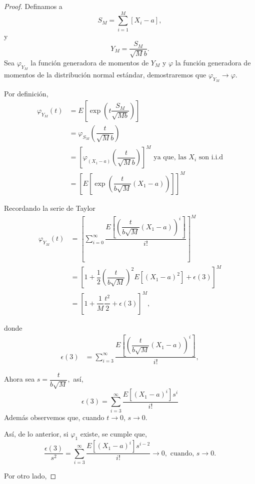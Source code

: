 \documentclass[
  letterpaper,
  DIV=11,
  numbers=noendperiod]{scrreprt}
\theoremstyle{definition}
\theoremstyle{plain}
\theoremstyle{remark}
\begin{document}
\begin{proof}

Definamos a \[
S_{M}={\displaystyle \sum_{i=1}^{M}}\left[X_{i}-a\right],
\] y \[
Y_{M}=\dfrac{S_{M}}{\sqrt{M}b}.
\] Sea \(\varphi_{Y_{M}}\) la función generadora de momentos de
\(Y_{M}\) y \(\varphi\) la función generadora de momentos de la
distribución normal estándar, demostraremos que
\(\varphi_{Y_{M}}\to\varphi\).

Por definición, \begin{align*}
\varphi_{Y_{M}}\left(t\right) & =E\left[\exp\left(t\dfrac{S_{M}}{\sqrt{Mb}}\right)\right]\\
& =\varphi_{S_M}\left(\dfrac{t}{\sqrt{M}b}\right)\\
& =\left[\varphi_{\left(X_{1}-a\right)}\left(\dfrac{t}{\sqrt{M}b}\right)\right]^{M} \text{ ya que, las }X_{i}\text{ son i.i.d}\\
& =\left[E\left[\exp\left(\dfrac{t}{b\sqrt{M}}\left(X_{1}-a\right)\right)\right]\right]^{M}
\end{align*}

Recordando la serie de Taylor \begin{align*}
\varphi_{Y_M}\left(t\right) & =\left[\sum_{i=0}^{\infty}\dfrac{E\left[\left(\dfrac{t}{b\sqrt{M}}\left(X_{1}-a\right)\right)^{i}\right]}{i!}\right]^{M}\\
& =\left[1+\dfrac{1}{2}\left(\dfrac{t}{b\sqrt{M}}\right)^{2}E\left[\left(X_{1}-a\right)^{2}\right]+\epsilon\left(3\right)\right]^{M}\\
& =\left[1+\dfrac{1}{M}\dfrac{t^{2}}{2}+\epsilon\left(3\right)\right]^{M},
\end{align*}

donde \begin{align*}
\epsilon\left(3\right) & =\sum_{i=3}^{\infty}\dfrac{E\left[\left(\dfrac{t}{b\sqrt{M}}\left(X_{1}-a\right)\right)^{i}\right]}{i!},
\end{align*}

Ahora sea \(s=\dfrac{t}{b\sqrt{M}},\) así,\\
\[
\epsilon\left(3\right)=\sum_{i=3}^{\infty}\dfrac{E\left[\left(X_{1}-a\right)^{i}\right]s^{i}}{i!}
\] Además observemos que, cuando \(t\to0\), \(s\to0\).

Así, de lo anterior, si \(\varphi_{1}\) existe, se cumple que, \[
\dfrac{\epsilon\left(3\right)}{s^{2}}=\sum_{i=3}^{\infty}\dfrac{E\left[\left(X_{1}-a\right)^{i}\right]s^{i-2}}{i!}\to0,\text{ cuando, }s\to0.
\]

Por otro lado,


\end{proof}
\end{document}
